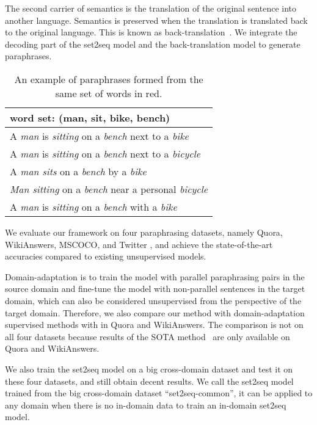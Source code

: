 The second carrier of semantics is the translation of the 
original sentence into another language. 
Semantics is preserved when the translation is translated back to the 
original language. This is known as back-translation~\citep{wieting2017paranmt}. 
We integrate the decoding part of the set2seq model and 
the back-translation model to generate paraphrases.

\begin{table}[th]
\small
\centering
\begin{tabular}{l}
\hline 
word set: \textbf{(man, sit, bike, bench)} \\
\hline
A \textit{\color{red}man} is \textit{\color{red}sitting} on a \textit{\color{red}bench} next to a \textit{\color{red}bike} \\
A \textit{\color{red}man} is \textit{\color{red}sitting} on a \textit{\color{red}bench} next to a \textit{\color{red}bicycle} \\
A \textit{\color{red}man sits} on a \textit{\color{red}bench} by a \textit{\color{red}bike} \\
\textit{\color{red}Man sitting} on a \textit{\color{red}bench} near a personal \textit{\color{red}bicycle} \\
A \textit{\color{red}man} is \textit{\color{red}sitting} on a \textit{\color{red}bench} with a \textit{\color{red}bike} \\
\hline
\end{tabular}
\caption{\label{para-example} An example of paraphrases formed
from the same set of words in red.} 
\end{table}

We evaluate our framework on four paraphrasing datasets, namely Quora, WikiAnswers, MSCOCO, and Twitter \citep{lan2017continuously}, and achieve the state-of-the-art accuracies compared to existing unsupervised models. 

Domain-adaptation is to train the model with parallel paraphrasing pairs 
in the source domain and fine-tune the model with non-parallel sentences 
in the target domain, which can also be considered unsupervised from 
the perspective of the target domain. Therefore, we also compare 
our method with domain-adaptation supervised methods with  in 
Quora and WikiAnswers. The comparison is not on all four datasets 
because results of the SOTA method~\citep{li2019decomposable} are only 
available on Quora and WikiAnswers.

We also train the set2seq model on a big cross-domain dataset and test it on these four datasets, and still obtain decent results. We call the set2seq model trained from the big cross-domain dataset ``set2seq-common'', it can be applied to any domain when there is no in-domain data to train an in-domain set2seq model.

